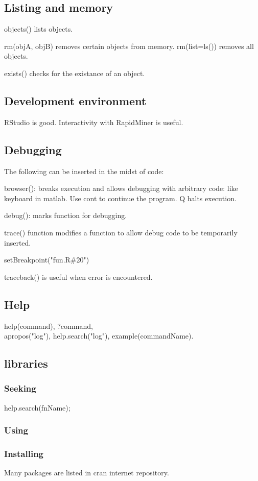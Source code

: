 \subsection{Listing and memory}
objects() lists objects.

rm(objA, objB) removes certain objects from memory. rm(list=ls()) removes all objects.


exists() checks for the existance of an object.

\subsection{Development environment}
RStudio is good. Interactivity with RapidMiner is useful.

\subsection{Debugging}
The following can be inserted in the midst of code:

browser(): breaks execution and allows debugging with arbitrary code: like keyboard in matlab. Use cont to continue the program. Q halts execution.

debug(): marks function for debugging.

trace() function modifies a function to allow debug code to be temporarily inserted.

setBreakpoint("fun.R\#20")

traceback() is useful when error is encountered.

\subsection{Help}
help(command), ?command, \\
apropos("log"), help.search("log"), example(commandName).

\subsection{libraries}
\subsubsection{Seeking}
help.search(fnName);

\subsubsection{Using}

\subsubsection{Installing}
Many packages are listed in cran internet repository.

